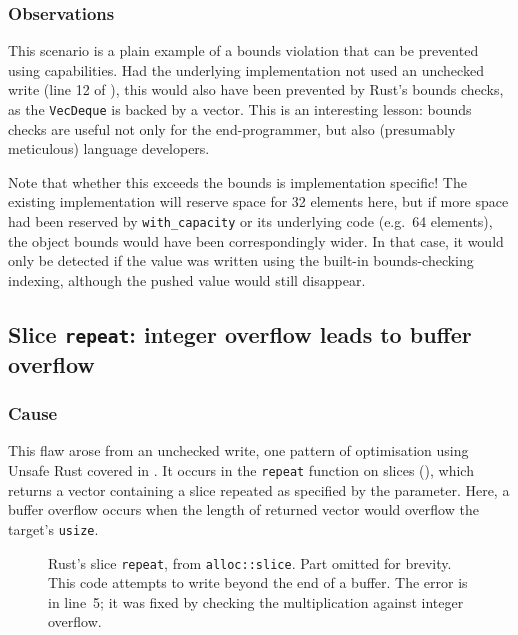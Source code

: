 \documentclass[dissertation.tex]{subfiles}
\begin{document}
\subsubsection{Observations}
This scenario is a plain example of a bounds violation that can be
prevented using capabilities.
Had the underlying implementation not used an unchecked write (line 12
of ), this would also have been prevented by Rust's
bounds checks, as the \texttt{VecDeque} is backed by a vector.
This is an interesting lesson: bounds checks are useful not only for the
end-programmer, but also (presumably meticulous) language developers.

Note that whether this exceeds the bounds is implementation specific!
The existing implementation will reserve space for 32 elements here, but
if more space had been reserved by \texttt{with\_capacity} or its
underlying code (e.g.\ 64 elements), the object bounds would have been
correspondingly wider.
In that case, it would only be detected if the value was written using
the built-in bounds-checking indexing, although the pushed value would
still disappear.


\subsection{Slice \texttt{repeat}: integer overflow leads to buffer overflow}
\label{sec:eval-micro-repeat}

\subsubsection{Cause}
This flaw arose from an unchecked write, one pattern of optimisation
using Unsafe Rust covered in .
It occurs in the \texttt{repeat} function on slices
(), which returns a vector containing a slice
repeated as specified by the parameter.
Here, a buffer overflow occurs when the length of returned vector would
overflow the target's \texttt{usize}.

\begin{figure}[ht]
    
    \caption{
        Rust's slice \texttt{repeat}, from \texttt{alloc::slice}.
        Part omitted for brevity.
        This code attempts to write beyond the end of a buffer.
        The error is in line~5; it was fixed by checking the
        multiplication against integer overflow.
    }
    \label{lst:slice-repeat}
\end{figure}
\end{document}
